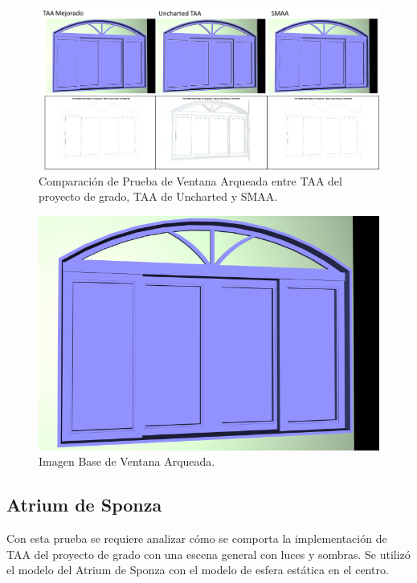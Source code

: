\documentclass[pregrado]{tesis-usb} %
\begin{document}
\begin{figure}[!htb]
	\centering
	\includegraphics[scale=0.3]{images/results/window_arch.png}
	\caption{Comparación de Prueba de Ventana Arqueada entre TAA del proyecto de grado, TAA de Uncharted y SMAA.}\label{fig:window_arch_render}
\end{figure}

\begin{figure}[!htb]
	\centering
	\includegraphics[scale=0.18]{images/results/window_arch_sobel_ground_truth.png}
	\caption{Imagen Base de Ventana Arqueada.}\label{fig:window_arch_truth}
\end{figure}

\FloatBarrier

\subsection{Atrium de Sponza}
Con esta prueba se requiere analizar cómo se comporta la implementación de TAA del proyecto de grado con una escena general con luces y sombras. Se utilizó el modelo del Atrium de Sponza con el modelo de esfera estática en el centro.
\end{document}
